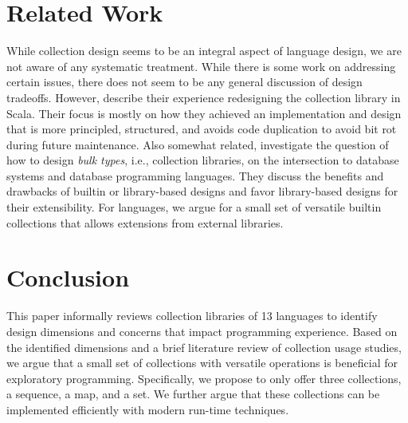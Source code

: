 \documentclass[sigconf, 10pt]{acmart}
\begin{document}
% 


\section{Related Work}

While collection design seems to be an integral aspect of language design,
we are not aware of any systematic treatment.
While there is some work on addressing certain 
issues\citep{Cook:1992:ISS,Black:2003:ATS,Chakravarty:2005:ATC,Garcia:2007},
there does not seem to be any general discussion of design tradeoffs.
However, \citet{Odersky:2009} describe their experience
redesigning the collection library in Scala.
Their focus is mostly on how they achieved an implementation and design
that is more principled, structured, and avoids code duplication
to avoid bit rot during future maintenance.
Also somewhat related, \citet{Matthes:2000:BT} investigate the question of how to design \emph{bulk types}, i.e., collection libraries, on the intersection to database systems and database programming languages.
They discuss the benefits and drawbacks of builtin or library-based designs and favor library-based designs for their extensibility.
For languages, we argue for a small set of versatile builtin collections
that allows extensions from external libraries.

\section{Conclusion}

This paper informally reviews collection libraries of 13 languages to identify
design dimensions and concerns that impact programming experience.
Based on the identified dimensions
and a brief literature review of collection usage studies,
we argue that a small set of collections with versatile operations
is beneficial for exploratory programming.
Specifically, we propose to only offer three collections, a sequence, a map, and a set.
We further argue that these collections can be implemented efficiently
with modern run-time techniques.
\end{document}
